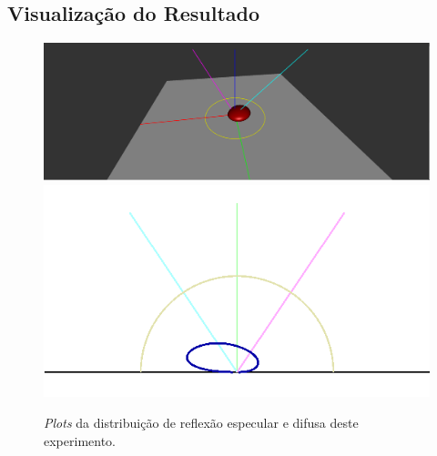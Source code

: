 \subsection{Visualização do Resultado}
\begin{figure}[H]
    \caption{\small{\textit{Plots} da distribuição de reflexão especular e difusa deste experimento.}}
    \label{fig-duer-plots}
    \vspace{42px}
  \includegraphics[width=\linewidth]{./Imagens/brdfs/duer-3D-plot}
\endminipage\hfill
{}
  \includegraphics[width=\linewidth]{./Imagens/brdfs/duer-polar-plot.png}
\endminipage\hfill
\end{figure}

